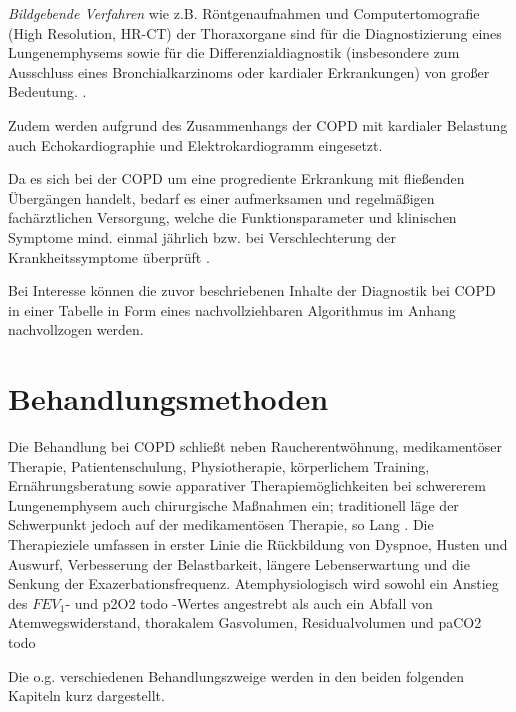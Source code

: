 \emph{Bildgebende Verfahren} wie z.B. Röntgenaufnahmen und Computertomografie (High Resolution, HR-CT) der Thoraxorgane sind für die Diagnostizierung eines Lungenemphysems sowie für die Differenzialdiagnostik (insbesondere zum Ausschluss eines Bronchialkarzinoms oder kardialer Erkrankungen) von großer Bedeutung. \autocite[191]{welte2007}.

Zudem werden aufgrund des Zusammenhangs der COPD mit kardialer Belastung auch Echokardiographie und Elektrokardiogramm eingesetzt.

Da es sich bei der COPD um eine progrediente Erkrankung mit fließenden Übergängen handelt, bedarf es einer aufmerksamen und regelmäßigen fachärztlichen Versorgung, welche die Funktionsparameter und klinischen Symptome mind. einmal jährlich bzw. bei Verschlechterung der Krankheitssymptome überprüft \autocite[vgl.][e8ff.]{vogelmeier2007}.

Bei Interesse können die zuvor beschriebenen Inhalte der Diagnostik bei COPD in einer Tabelle in Form eines nachvollziehbaren Algorithmus im Anhang nachvollzogen werden.

\section{Behandlungsmethoden}
\label{behandlungsmethoden}
Die Behandlung bei COPD schließt neben Raucherentwöhnung, medikamentöser Therapie, Patientenschulung, Physiotherapie, körperlichem Training, Ernährungsberatung sowie apparativer Therapiemöglichkeiten bei schwererem Lungenemphysem auch chirurgische Maßnahmen ein; traditionell läge der Schwerpunkt jedoch auf der medikamentösen Therapie, so Lang \autocite[vgl.][287]{lang2007}. Die Therapieziele umfassen in erster Linie die Rückbildung von Dyspnoe, Husten und Auswurf, Verbesserung der Belastbarkeit, längere Lebenserwartung und die Senkung der Exazerbationsfrequenz. Atemphysiologisch wird sowohl ein Anstieg des $FEV_{1}$- und p2O2 todo -Wertes angestrebt als auch ein Abfall von Atemwegswiderstand, thorakalem Gasvolumen, Residualvolumen und paCO2 todo \author[vgl.][158]{lorenz2009}
Die o.g. verschiedenen Behandlungszweige werden in den beiden folgenden Kapiteln kurz dargestellt.

